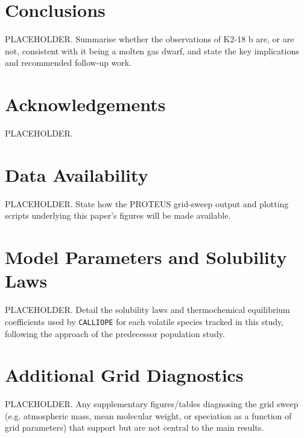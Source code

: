 \documentclass[fleqn,usenatbib]{mnras}
\begin{document}
\section{Conclusions}
\label{sec:conclusions}

PLACEHOLDER. Summarise whether the observations of K2-18 b are, or are not,
consistent with it being a molten gas dwarf, and state the key implications
and recommended follow-up work.

\section*{Acknowledgements}

PLACEHOLDER.

\section*{Data Availability}

PLACEHOLDER. State how the PROTEUS grid-sweep output and plotting scripts
underlying this paper's figures will be made available.




\appendix

\section{Model Parameters and Solubility Laws}
\label{apsec:solubilitylaws}

PLACEHOLDER. Detail the solubility laws and thermochemical equilibrium
coefficients used by \texttt{CALLIOPE} for each volatile species tracked in
this study, following the approach of the predecessor population study.

\section{Additional Grid Diagnostics}
\label{apsec:additionaldiagnostics}

PLACEHOLDER. Any supplementary figures/tables diagnosing the grid sweep
(e.g. atmospheric mass, mean molecular weight, or speciation as a function of
grid parameters) that support but are not central to the main results.

\bsp	%
\label{lastpage}
\end{document}
